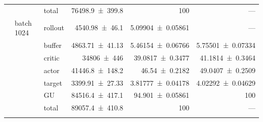 {\begin{longtable}{@{}lllrrr@{}}
     &  & total & \num{76498.9+-399.8} & \num{100} & --- \\
    \addlinespace[2pt]
     & batch 1024 & rollout & \num{4540.98+-46.1} & \num{5.09904+-0.05861} & --- \\
     &  & buffer & \num{4863.71+-41.13} & \num{5.46154+-0.06766} & \num{5.75501+-0.07334} \\
     &  & critic & \num{34806+-446} & \num{39.0817+-0.3477} & \num{41.1814+-0.3464} \\
     &  & actor & \num{41446.8+-148.2} & \num{46.54+-0.2182} & \num{49.0407+-0.2509} \\
     &  & target & \num{3399.91+-27.33} & \num{3.81777+-0.04178} & \num{4.02292+-0.04629} \\
     &  & GU & \num{84516.4+-417.1} & \num{94.901+-0.05861} & 100 \\
     &  & total & \num{89057.4+-410.8} & \num{100} & --- \\
    \addlinespace[2pt]
  \end{longtable}
}

